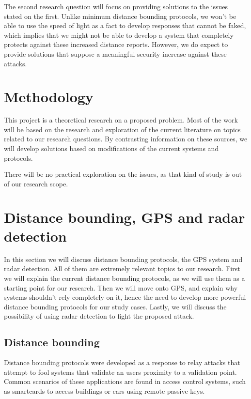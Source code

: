 \documentclass{article}
\begin{document}
The second research question will focus on providing solutions to the issues stated on the first. Unlike minimum distance bounding protocols, we won't be able to use the speed of light as a fact to develop responses that cannot be faked, which implies that we might not be able to develop a system that completely protects against these increased distance reports. However, we do expect to provide solutions that suppose a meaningful security increase against these attacks.

\section{Methodology}

This project is a theoretical research on a proposed problem. Most of the work will be based on the research and exploration of the current literature on topics related to our research questions. By contrasting information on these sources, we will develop solutions based on modifications of the current systems and protocols.

There will be no practical exploration on the issues, as that kind of study is out of our research scope.

\section{Distance bounding, GPS and radar detection}

In this section we will discuss distance bounding protocols, the GPS system and radar detection. All of them are extremely relevant topics to our research. First we will explain the current distance bounding protocols, as we will use them as a starting point for our research. Then we will move onto GPS, and explain why systems shouldn't rely completely on it, hence the need to develop more powerful distance bounding protocols for our study cases. Lastly, we will discuss the possibility of using radar detection to fight the proposed attack.

\subsection{Distance bounding}

Distance bounding protocols were developed as a response to relay attacks that attempt to fool systems that validate an users proximity to a validation point. Common scenarios of these applications are found in access control systems, such as smartcards to access buildings or cars using remote passive keys.
\end{document}

